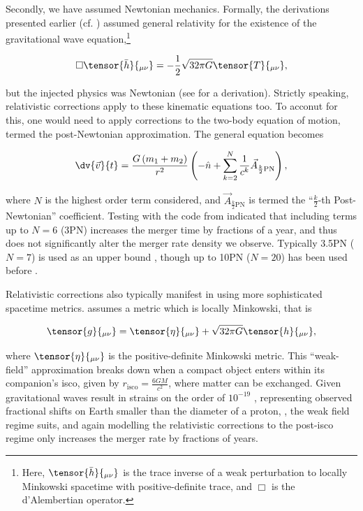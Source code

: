 Secondly, we have assumed Newtonian mechanics. Formally, the derivations presented earlier (cf. ) assumed general relativity for the existence of the gravitational wave equation,\footnote{Here, $\tensor{\bar{h}}{_{\mu\nu}}$ is the trace inverse of a weak perturbation to locally Minkowski spacetime with positive-definite trace, and $\Box$ is the d'Alembertian operator.}

\begin{equation}
    \Box \tensor{\bar{h}}{_{\mu\nu}} = -\frac12 \sqrt{32\pi G}\tensor{T}{_{\mu\nu}},\label{eq:GW_spacetime_equation}
\end{equation}

but the injected physics was Newtonian (see \citet{Richards:2021} for a derivation). Strictly speaking, relativistic corrections apply to these kinematic equations too. To acconut for this, one would need to apply corrections to the two-body equation of motion, termed the post-Newtonian approximation. The general equation becomes

\begin{equation}
    \dv{\vec{v}}{t} = \frac{G\left(m_1+m_2\right)}{r^2}\left(-\hat{n} + \sum_{k=2}^N \frac{1}{c^k}\vec{A}_{\frac{k}{2}\text{PN}} \right),
\end{equation}

where $N$ is the highest order term considered, and $\vec{A}_{\frac{k}{2}\text{PN}}$ is termed the ``$\frac{k}{2}$-th Post-Newtonian'' coefficient. Testing with the  code from \citet{Van_zeist:2021} indicated that including terms up to $N=6$ (3PN) increases the merger time by fractions of a year, and thus does not significantly alter the merger rate density we observe.  Typically 3.5PN ($N=7$) is used as an upper bound \citep{Itoh:2003}, though up to 10PN ($N=20$) has been used before \citep[][and references therein]{Blanchet:2014}.

Relativistic corrections also typically manifest in using more sophisticated spacetime metrics.  assumes a metric which is locally Minkowski, that is

\begin{equation}
    \tensor{g}{_{\mu\nu}} = \tensor{\eta}{_{\mu\nu}}+\sqrt{32\pi G} \tensor{h}{_{\mu\nu}},
\end{equation}

where $\tensor{\eta}{_{\mu\nu}}$ is the positive-definite Minkowski metric. This ``weak-field'' approximation breaks down when a compact object enters within its companion's \gls{isco}, given by $r_\text{isco}=\frac{6GM}{c^2}$, where matter can be exchanged. Given gravitational waves result in strains on the order of $10^{-19}$ \citep{Van_zeist:2023}, representing observed fractional shifts on Earth smaller than the diameter of a proton, \citep{Moore:2014}, the weak field regime suits, and again modelling the relativistic corrections to the post-\gls{isco} regime only increases the merger rate by fractions of years.

